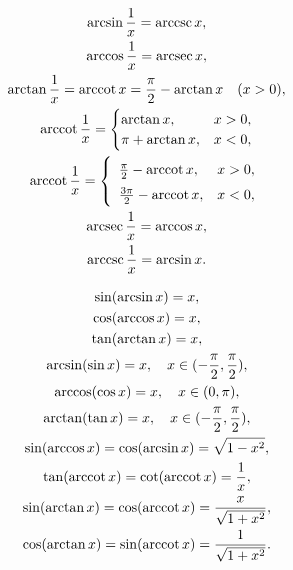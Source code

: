 \begin{theorem}[倒数关系]
\begin{gather}
	\arcsin\frac{1}{x} = \arccsc x, \\
	\arccos\frac{1}{x} = \arcsec x, \\
	\arctan\frac{1}{x} = \arccot x
		= \frac{\pi}{2} - \arctan x
	\quad(x>0), \\
	\arccot\frac{1}{x} = \begin{cases}
		\arctan x, & x>0, \\
		\pi+\arctan x, & x<0,
		\end{cases} \\
	\arccot\frac{1}{x} = \left\{ \def\arraystretch{1.5} \begin{array}{lc}
		\frac{\pi}{2} - \arccot x, & x>0, \\
		\frac{3\pi}{2} - \arccot x, & x<0,
		\end{array} \right. \\
	\arcsec\frac{1}{x} = \arccos x, \\
	\arccsc\frac{1}{x} = \arcsin x.
\end{gather}
\end{theorem}

\begin{theorem}[三角关系]
\begin{gather}
	\sin(\arcsin{x}) = x, \\
	\cos(\arccos{x}) = x, \\
	\tan(\arctan{x}) = x, \\
	\arcsin(\sin x) = x, \quad x \in (-\frac{\pi}{2},\frac{\pi}{2}), \\
	\arccos(\cos x) = x, \quad x \in (0,\pi), \\
	\arctan(\tan x) = x, \quad x \in (-\frac{\pi}{2},\frac{\pi}{2}), \\
	\sin(\arccos{x}) = \cos(\arcsin{x}) = \sqrt{1 - x^2}, \\
	\tan(\arccot{x}) = \cot(\arccot{x}) = \frac{1}{x}, \\
	\sin(\arctan{x}) = \cos(\arccot{x}) = \frac{x}{\sqrt{1+x^2}}, \\
	\cos(\arctan{x}) = \sin(\arccot{x}) = \frac{1}{\sqrt{1+x^2}}.
\end{gather}
\end{theorem}

